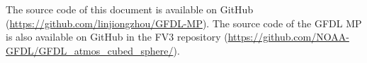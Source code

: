 \documentclass[letterpaper,titlepage,10pt]{article}
\numberwithin{equation}{section}
\begin{document}
The source code of this document is available on GitHub (\url{https://github.com/linjiongzhou/GFDL-MP}). The source code of the GFDL MP is also available on GitHub in the FV3 repository (\url{https://github.com/NOAA-GFDL/GFDL_atmos_cubed_sphere/}).






\end{document}
